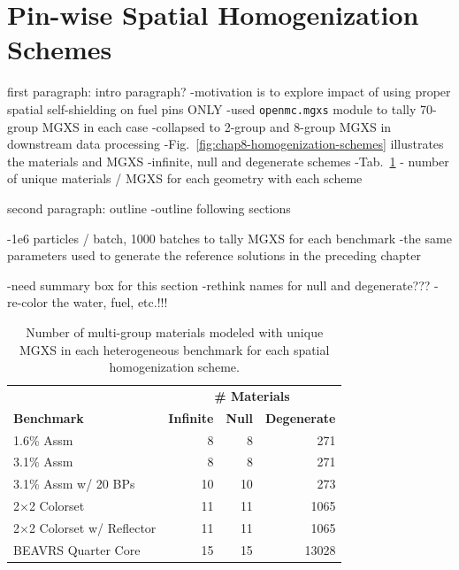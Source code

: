 \section{Pin-wise Spatial Homogenization Schemes}
\label{sec:chap8-pinwise-space-homogenize}

first paragraph: intro paragraph?
-motivation is to explore impact of using proper spatial self-shielding on fuel pins ONLY
-used \texttt{openmc.mgxs} module to tally 70-group \ac{MGXS} in each case
  -collapsed to 2-group and 8-group \ac{MGXS} in downstream data processing
-Fig.~\ref{fig:chap8-homogenization-schemes} illustrates the materials and \ac{MGXS}
  -infinite, null and degenerate schemes
-Tab.~\ref{table:chap8-num-materials} - number of unique materials / \ac{MGXS} for each geometry with each scheme

second paragraph: outline
-outline following sections

-1e6 particles / batch, 1000 batches to tally \ac{MGXS} for each benchmark
  -the same parameters used to generate the reference solutions in the preceding chapter

-need summary box for this section
-rethink names for null and degenerate???
-re-color the water, fuel, etc.!!!

\begin{table}[h!]
  \centering
  \caption[Number of multi-group material for each spatial homogenization scheme]{Number of multi-group materials modeled with unique \ac{MGXS} in each heterogeneous benchmark for each spatial homogenization scheme.}
  \small
  \label{table:chap8-num-materials}
  \vspace{6pt}
  \begin{tabular}{l r r r}
  \toprule
  \rowcolor{lightgray}
  & \multicolumn{3}{c}{\cellcolor{lightgray} \bf \# Materials} \\
  \multirow{-2}{*}{\cellcolor{lightgray} \bf Benchmark} &
  \multicolumn{1}{c}{{\cellcolor{lightgray} \bf Infinite}} &
  \multicolumn{1}{c}{{\cellcolor{lightgray} \bf Null}} &
  \multicolumn{1}{c}{{\cellcolor{lightgray} \bf Degenerate}} \\
  \midrule
1.6\% Assm & 8 & 8 & 271 \\
  \midrule
3.1\% Assm & 8 & 8 & 271 \\
  \midrule
3.1\% Assm w/ 20 BPs & 10 & 10 & 273  \\
  \midrule
2$\times$2 Colorset & 11 & 11 & 1065 \\
  \midrule
2$\times$2 Colorset w/ Reflector & 11 & 11 & 1065 \\
  \midrule
\ac{BEAVRS} Quarter Core & 15 & 15 & 13028 \\ %
  \bottomrule
\end{tabular}
\end{table}


